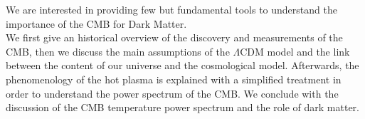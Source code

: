 \documentclass{article}
\begin{document}
We are interested in providing few but fundamental tools to understand the importance of the CMB for Dark Matter.\\
We first give an historical overview of the discovery and measurements of the CMB, then we discuss the main assumptions of the $\Lambda$CDM model and the link between the content of our universe and the cosmological model. 
Afterwards, the phenomenology of the hot plasma is explained with a simplified treatment in order to understand the power spectrum of the CMB.
We conclude with the discussion of the CMB temperature power spectrum and the role of dark matter.


\pagebreak
\end{document}
